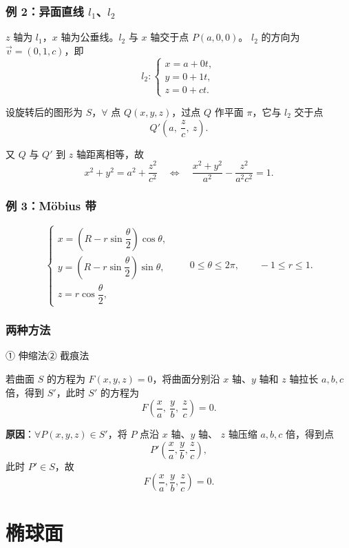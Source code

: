 \documentclass[UTF8,11pt]{ctexart}
\theoremstyle{cnthm}
\begin{document}
\subsubsection*{例 2：异面直线 $l_1$、$l_2$}

$z$ 轴为 $l_1$，$x$ 轴为公垂线。$l_2$ 与 $x$ 轴交于点 $P(a,0,0)$。
$l_2$ 的方向为 $\vec v=(0,1,c)$，即
\[
l_2:\begin{cases}x=a+0t, \\ y=0+1t, \\ z=0+ct .\end{cases}
\]

设旋转后的图形为 $S$，$\forall$ 点 $Q(x,y,z)$，过点 $Q$ 作平面
$\pi$，它与 $l_2$ 交于点
\[
Q'\left(a,\ \frac{z}{c},\ z\right).
\]

又 $Q$ 与 $Q'$ 到 $z$ 轴距离相等，故
\[
x^2+y^2=a^2+\frac{z^2}{c^2}
\quad\Longleftrightarrow\quad
\frac{x^2+y^2}{a^2}-\frac{z^2}{a^2c^2}=1 .
\]

\subsubsection*{例 3：Möbius 带}

\[
\begin{cases}
x=\left(R-r\sin\dfrac{\theta}{2}\right)\cos\theta,\\[8pt]
y=\left(R-r\sin\dfrac{\theta}{2}\right)\sin\theta,\\[8pt]
z=r\cos\dfrac{\theta}{2},
\end{cases}
\qquad
0\leq\theta\leq2\pi,\qquad -1\leq r\leq1 .
\]

\subsubsection*{两种方法}

① 伸缩法\quad ② 截痕法

若曲面 $S$ 的方程为 $F(x,y,z)=0$，将曲面分别沿 $x$ 轴、$y$ 轴和
$z$ 轴拉长 $a,b,c$ 倍，得到 $S'$，此时 $S'$ 的方程为
\[
F\left(\frac{x}{a},\ \frac{y}{b},\ \frac{z}{c}\right)=0 .
\]

\textbf{原因}：$\forall P(x,y,z)\in S'$，将 $P$ 点沿 $x$ 轴、$y$ 轴、
$z$ 轴压缩 $a,b,c$ 倍，得到点
\[
P'\left(\frac{x}{a},\frac{y}{b},\frac{z}{c}\right),
\]
此时 $P'\in S$，故
\[
F\left(\frac{x}{a},\frac{y}{b},\frac{z}{c}\right)=0 .
\]

\section{椭球面}
\end{document}
